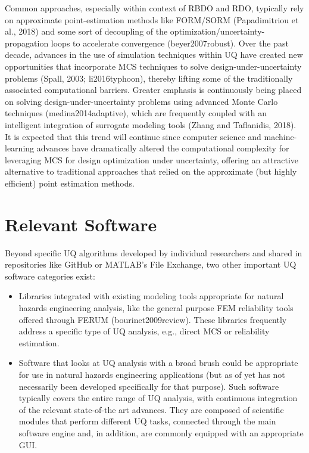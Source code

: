 Common approaches, especially within context of RBDO and RDO, typically rely on approximate point-estimation methods like FORM/SORM (Papadimitriou et al., 2018) and some sort of decoupling of the optimization/uncertainty-propagation loops to accelerate convergence (beyer2007robust). Over the past decade, advances in the use of simulation techniques within UQ have created new opportunities that incorporate MCS techniques to solve design-under-uncertainty problems (Spall, 2003; li2016typhoon), thereby lifting some of the traditionally associated computational barriers. Greater emphasis is continuously being placed on solving design-under-uncertainty problems using advanced Monte Carlo techniques (medina2014adaptive), which are frequently coupled with an intelligent integration of surrogate modeling tools (Zhang and Taflanidis, 2018). It is expected that this trend will continue since computer science and machine-learning advances have dramatically altered the computational complexity for leveraging MCS for design optimization under uncertainty, offering an attractive alternative to traditional approaches that relied on the approximate (but highly efficient) point estimation methods. 

\section{Relevant Software}
\label{sec:uq_tools}

Beyond specific UQ algorithms developed by individual researchers and shared in repositories like GitHub or MATLAB’s File Exchange, two other important UQ software categories exist:

\begin{itemize}
    \item Libraries integrated with existing modeling tools appropriate for natural hazards engineering analysis, like the general purpose FEM reliability tools offered through FERUM (bourinet2009review). These libraries frequently address a specific type of UQ analysis, e.g., direct MCS or reliability estimation.
    \item Software that looks at UQ analysis with a broad brush could be appropriate for use in natural hazards engineering applications (but as of yet has not necessarily been developed specifically for that purpose). Such software typically covers the entire range of UQ analysis, with continuous integration of the relevant state-of-the art advances. They are composed of scientific modules that perform different UQ tasks, connected through the main software engine and, in addition, are commonly equipped with an appropriate GUI. 
\end{itemize}
	
